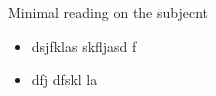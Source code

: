 Minimal reading on the subjecnt 

\begin{itemize}
      \item{
          dsjfklas skfljasd f
        }
      \item{
          dfj dfskl la

        }
\end{itemize}
